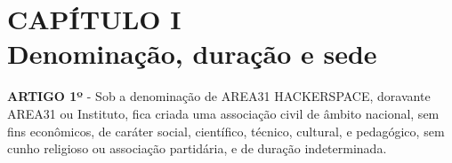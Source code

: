 \chapter*{CAPÍTULO I \\ Denominação, duração e sede}

\textbf{ARTIGO 1º} - Sob a denominação de AREA31 HACKERSPACE, 
doravante AREA31 ou Instituto, fica criada uma associação civil de 
âmbito nacional, sem fins econômicos, de caráter social, científico, 
técnico, cultural, e pedagógico, sem cunho religioso ou associação 
partidária, e de duração indeterminada.

